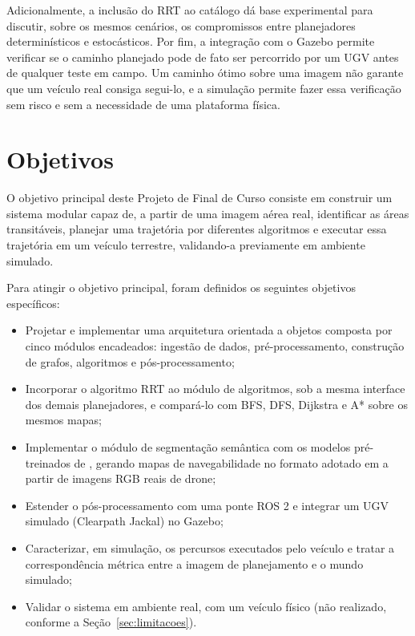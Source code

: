 \documentclass[
    12pt,
    openright,
    oneside,
    a4paper,
    english,
    brazil
]{abntex2}
\begin{document}
Adicionalmente, a inclusão do RRT ao catálogo dá base experimental para discutir, sobre os mesmos cenários, os compromissos entre planejadores determinísticos e estocásticos. Por fim, a integração com o Gazebo permite verificar se o caminho planejado pode de fato ser percorrido por um UGV antes de qualquer teste em campo. Um caminho ótimo sobre uma imagem não garante que um veículo real consiga segui-lo, e a simulação permite fazer essa verificação sem risco e sem a necessidade de uma plataforma física.

\section{Objetivos}

O objetivo principal deste Projeto de Final de Curso consiste em construir um sistema modular capaz de, a partir de uma imagem aérea real, identificar as áreas transitáveis, planejar uma trajetória por diferentes algoritmos e executar essa trajetória em um veículo terrestre, validando-a previamente em ambiente simulado.

Para atingir o objetivo principal, foram definidos os seguintes objetivos específicos:

\begin{itemize}
    \item Projetar e implementar uma arquitetura orientada a objetos composta por cinco módulos encadeados: ingestão de dados, pré-processamento, construção de grafos, algoritmos e pós-processamento;
    \item Incorporar o algoritmo RRT ao módulo de algoritmos, sob a mesma interface dos demais planejadores, e compará-lo com BFS, DFS, Dijkstra e A* sobre os mesmos mapas;
    \item Implementar o módulo de segmentação semântica com os modelos pré-treinados de \cite{junior2024_models}, gerando mapas de navegabilidade no formato adotado em \cite{junior2025_rrt} a partir de imagens RGB reais de drone;
    \item Estender o pós-processamento com uma ponte ROS 2 e integrar um UGV simulado (Clearpath Jackal) no Gazebo;
    \item Caracterizar, em simulação, os percursos executados pelo veículo e tratar a correspondência métrica entre a imagem de planejamento e o mundo simulado;
    \item Validar o sistema em ambiente real, com um veículo físico (não realizado, conforme a Seção~\ref{sec:limitacoes}).
\end{itemize}
\end{document}
